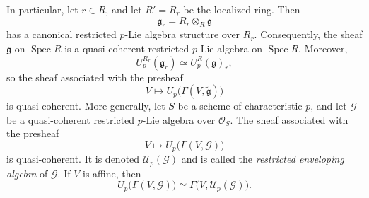 In particular, let \(r\in R\), and let \(R'=R_r\) be the
localized ring. Then
\[
  \mathfrak g_r=R_r\otimes_R\mathfrak g
\]
has a canonical restricted \(p\)-Lie algebra structure over
\(R_r\). Consequently, the sheaf \(\widetilde{\mathfrak g}\) on
\(\operatorname{Spec}R\) is a quasi-coherent restricted
\(p\)-Lie algebra on \(\operatorname{Spec}R\). Moreover,
\[
  U_p^{R_r}(\mathfrak g_r)
  \simeq
  U_p^R(\mathfrak g)_r,
\]
so the sheaf associated with the presheaf
\[
  V\longmapsto
  U_p\bigl(\Gamma(V,\widetilde{\mathfrak g})\bigr)
\]
is quasi-coherent. More generally, let \(S\) be a scheme of
characteristic \(p\), and let \(\mathcal G\) be a quasi-coherent
restricted \(p\)-Lie algebra over \(\mathcal O_S\). The sheaf associated
with the presheaf
\[
  V\longmapsto U_p\bigl(\Gamma(V,\mathcal G)\bigr)
\]
is quasi-coherent. It is denoted
\(\mathcal U_p(\mathcal G)\) and is called the
\emph{restricted enveloping algebra} of \(\mathcal G\). If \(V\)
is affine, then
\[
  U_p\bigl(\Gamma(V,\mathcal G)\bigr)
  \simeq
  \Gamma\bigl(V,\mathcal U_p(\mathcal G)\bigr).
\]

